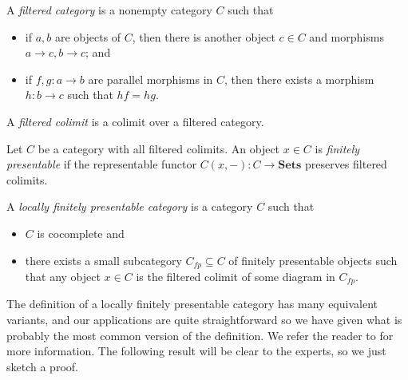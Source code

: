 \documentclass{amsbook} %
\newcommand{\cn}{\colon}
\newcommand{\mb}{\mathbf}
\numberwithin{section}{chapter}
\begin{document}
\begin{Defi}
A \textit{filtered category} is a nonempty category $C$ such that
\begin{itemize}
\item if $a,b$ are objects of $C$, then there is another object $c \in C$ and morphisms $a \to c, b \to c$; and
\item if $f,g \cn a \to b$ are parallel morphisms in $C$, then there exists a morphism $h \cn b \to c$ such that $hf = hg$.
\end{itemize}
\end{Defi}

\begin{Defi}
A \emph{filtered colimit} is a colimit over a filtered category.
\end{Defi}

\begin{Defi}
Let $C$ be a category with all filtered colimits.  An object $x \in C$ is \textit{finitely presentable} if the representable functor $C(x, -):C \rightarrow \mb{Sets}$ preserves filtered colimits.
\end{Defi}

\begin{Defi}
A \textit{locally finitely presentable category} is a category $C$ such that
\begin{itemize}
\item $C$ is cocomplete and
\item there exists a small subcategory $C_{fp} \subseteq C$ of finitely presentable objects such that any object $x \in C$ is the filtered colimit of some diagram in $C_{fp}$.
\end{itemize}
\end{Defi}


The definition of a locally finitely presentable category has many equivalent variants, and our applications are quite straightforward so we have given what is probably the most common version of the definition.  We refer the reader to \cite{ar} for more information.  The following result will be clear to the experts, so we just sketch a proof.
\end{document}
